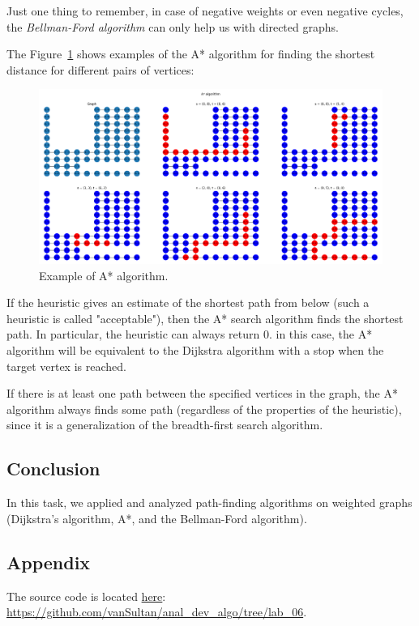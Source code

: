Just one thing to remember, in case of negative weights or even negative cycles, the \textit{Bellman-Ford algorithm} can only help us with directed graphs.

The Figure~\ref{ris:plot} shows examples of the A* algorithm for finding the shortest distance for different pairs of vertices:

\begin{figure}[H]
    \center
    \includegraphics[width=\textwidth]{img/plot.png}
    \caption{Example of A* algorithm.}
    \label{ris:plot}
\end{figure}

If the heuristic gives an estimate of the shortest path from below (such a heuristic is called "acceptable"), then the A* search algorithm finds the shortest path.
In particular, the heuristic can always return 0.
in this case, the A* algorithm will be equivalent to the Dijkstra algorithm with a stop when the target vertex is reached.

If there is at least one path between the specified vertices in the graph, the A* algorithm always finds some path (regardless of the properties of the heuristic), since it is a generalization of the breadth-first search algorithm.

\subsection{Conclusion}\label{subsec:conclusion}

In this task, we applied and analyzed path-finding algorithms on weighted graphs (Dijkstra's algorithm, A*, and the Bellman-Ford algorithm).

\subsection{Appendix}\label{subsec:appendix}

The source code is located \href{https://github.com/vanSultan/anal_dev_algo/tree/lab_06}{here}: \url{https://github.com/vanSultan/anal_dev_algo/tree/lab_06}.
